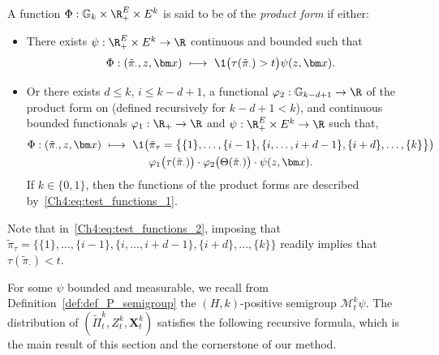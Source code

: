 \begin{refsegment}
\begin{defn}\label{def:product_functions}
  A function $\Phi:\mathbb{G}_k\times \R_+^E\times E^k$ is said to be of the \emph{product form} if either:
  \begin{itemize}
    \item There exists $\psi:  \R_+^E\times E^k\to \R$ continuous and bounded such that 
  \begin{equation}\label{Ch4:eq:test_functions_1}
 \Phi: (\tilde\pi_\cdot,  z, \bm x)\ \longmapsto\ \1\big(\tau(\tilde\pi_\cdot) > t\big)\psi(z, \bm x).
  \end{equation}
 \item Or there exists $d\leq k$, $i\leq k-d+1$, a functional $\varphi_2:\mathbb{G}_{k-d+1}\to\R$  of the product form on (defined recursively for $k-d+1 < k$), and continuous
  bounded functionals
  $\varphi_1: \R_+\to\R$ and $\psi:  \R_+^E\times E^k\to \R$ such that, 
\begin{multline}\label{Ch4:eq:test_functions_2}
   \Phi: (\tilde\pi_\cdot,  z, \bm x)\ \longmapsto\  \1\big( \tilde\pi_{\tau}= \big\{\{1\},\ldots,\{i-1\},\{i,\ldots, i+d-1\},\{i+d\},\ldots,\{k\}\big\}\big) \\
\varphi_1\big(\tau(\tilde\pi_\cdot)\big)\cdot\varphi_2\big(\Theta(\tilde\pi_\cdot)\big)\cdot\psi(z, \bm x).
\end{multline}
If $k\in \{0,1\}$, then the functions of the product forms are described by~\eqref{Ch4:eq:test_functions_1}.
\end{itemize}
\end{defn}
Note that in~\eqref{Ch4:eq:test_functions_2}, imposing that $\tilde\pi_{\tau}= \big\{\{1\},\ldots,\{i-1\},\{i,\ldots, i+d-1\},\{i+d\},\ldots,\{k\}\big\}$ readily implies that $\tau(\tilde\pi_\cdot) < t$.

For some $\psi$ bounded and measurable, we recall from Definition~\ref{def:def_P_semigroup} the $(H,k)$-positive semigroup $\mathcal{M}^k_t{\psi}$. 
The distribution of $(\tilde{\Pi}^k_t,  Z^k_t, \bm X^k_t)$ satisfies the following recursive formula, which is the main result of this section and the cornerstone of our method.



\end{refsegment}
